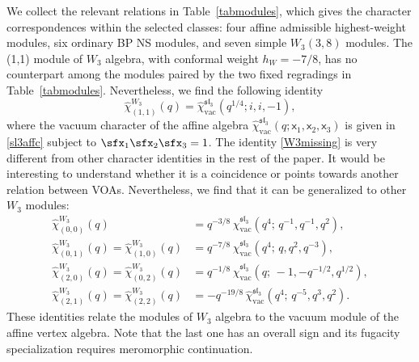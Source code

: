 \documentclass[a4paper,11pt]{article}
\theoremstyle{definition}
\theoremstyle{definition}
\theoremstyle{remark}
\newcommand{\be}{\begin{equation}}
\newcommand{\ee}{\end{equation}}
\begin{document}
 We collect the relevant relations in Table~\ref{tabmodules}, which  gives the character correspondences within the selected classes: four affine admissible highest-weight modules, six ordinary BP NS modules, and seven simple $W_3(3,8)$ modules.  The (1,1) module of $W_3$ algebra, with conformal weight $h_W=-7/8$,  has no counterpart among the modules paired by the two fixed
regradings in Table~\ref{tabmodules}.  Nevertheless, we find the following identity
\be\label{W3missing}
\widehat\chi^{W_3}_{(1,1)}(q)
=\widehat\chi^{\mathfrak{sl}_3}_{\text{vac}}(q^{1/4};i,i,-1), 
\ee
 where  the vacuum character of the  affine algebra  $ \widehat{\chi}_{\text{vac}}^{\mathfrak{sl}_3}( {q}; \mathsf{x}_1, \mathsf{x}_2, \mathsf{x}_3) $ is  given in     \eqref{sl3affc} subject to $\sfx_1\sfx_2\sfx_3=1$. The identity \eqref{W3missing} is very different from other character identities in the rest of the paper.  It would be interesting to understand whether it is a coincidence or points towards another   relation between VOAs.  Nevertheless, we find  that it can be generalized to other $W_3$ modules:
  \begin{align}
\widehat{\chi}^{W_3}_{(0,0)}(q)
&=
q^{-3/8}\,
\widehat{\chi}^{\mathfrak{sl}_3}_{\mathrm{vac}}
\left(q^4;\,q^{-1},q^{-1},q^2\right),
\\[4pt]
\widehat{\chi}^{W_3}_{(0,1)}(q)
=
\widehat{\chi}^{W_3}_{(1,0)}(q)
&=
q^{-7/8}\,
\widehat{\chi}^{\mathfrak{sl}_3}_{\mathrm{vac}}
\left(q^4;\,q,q^2,q^{-3}\right),
\\[4pt]
\widehat{\chi}^{W_3}_{(2,0)}(q)
=
\widehat{\chi}^{W_3}_{(0,2)}(q)
&=
q^{-1/8}\,
\widehat{\chi}^{\mathfrak{sl}_3}_{\mathrm{vac}}
\left(q;\,-1,-q^{-1/2},q^{1/2}\right), \\
\widehat{\chi}^{W_3}_{(2,1)}(q)
=
\widehat{\chi}^{W_3}_{(2,2)}(q)
&=
-q^{-19/8}\,
\widehat{\chi}^{\mathfrak{sl}_3}_{\mathrm{vac}}
\left(q^4;\,q^{-5},q^3,q^2\right).
\end{align}
 These identities relate the    modules of  $W_3$ algebra to the  vacuum module of  the affine vertex algebra. Note that the last one has an overall sign  and its fugacity specialization requires meromorphic continuation.
 
\end{document}
